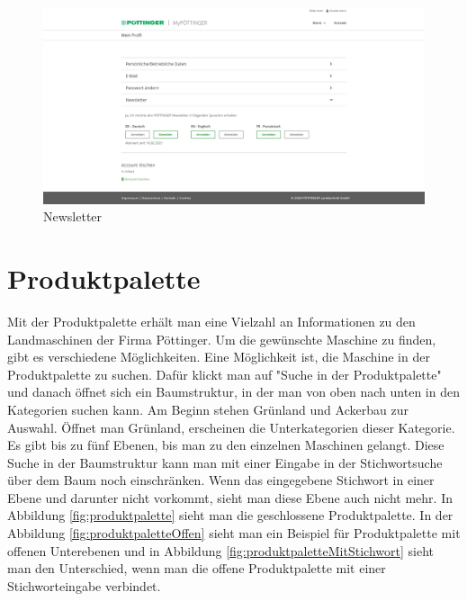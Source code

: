 \begin{figure}[H]
	\centerline{
		\includegraphics[width=1\textwidth, frame]{./grafiken/erm_profil_newsletter.png}
	}
	\vskip0pt
	\caption{Newsletter} \label{fig:newsletter}
\end{figure}

\section{Produktpalette}

Mit der Produktpalette erhält man eine Vielzahl an Informationen zu den Landmaschinen der Firma Pöttinger. Um die gewünschte Maschine zu finden, gibt es verschiedene Möglichkeiten. Eine Möglichkeit ist, die Maschine in der Produktpalette zu suchen. Dafür klickt man auf "Suche in der Produktpalette" und danach öffnet sich ein Baumstruktur, in der man von oben nach unten in den Kategorien suchen kann. Am Beginn stehen Grünland und Ackerbau zur Auswahl. Öffnet man Grünland, erscheinen die Unterkategorien dieser Kategorie. Es gibt bis zu fünf Ebenen, bis man zu den einzelnen Maschinen gelangt. Diese Suche in der Baumstruktur kann man mit einer Eingabe in der Stichwortsuche über dem Baum noch einschränken. Wenn das eingegebene Stichwort in einer Ebene und darunter nicht vorkommt, sieht man diese Ebene auch nicht mehr. In Abbildung \ref{fig:produktpalette} sieht man die geschlossene Produktpalette. In der Abbildung \ref{fig:produktpaletteOffen} sieht man ein Beispiel für Produktpalette mit offenen Unterebenen und in Abbildung \ref{fig:produktpaletteMitStichwort} sieht man den Unterschied, wenn man die offene Produktpalette mit einer Stichworteingabe verbindet.


